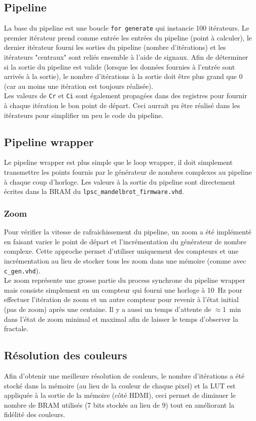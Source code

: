 \documentclass[LPSC_Labo03_SDeriaz]{subfiles}
\begin{document}
\subsection{Pipeline}
La base du pipeline est une boucle \verb!for generate! qui instancie 100 itérateurs. Le premier itérateur prend comme entrée les entrées du pipeline (point à calculer), le dernier itérateur fourni les sorties du pipeline (nombre d'itérations) et les itérateurs "centraux" sont reliés ensemble à l'aide de signaux. Afin de déterminer si la sortie du pipeline est valide (lorsque les données fournies à l'entrée sont arrivés à la sortie), le nombre d'itérations à la sortie doit être plus grand que 0 (car au moins une itération est toujours réalisée).\\
Les valeurs de \verb!Cr! et \verb!Ci! sont également propagées dans des registres pour fournir à chaque itération le bon point de départ. Ceci aurrait pu être réalisé dans les itérateurs pour simplifier un peu le code du pipeline.
\subsection{Pipeline wrapper}
Le pipeline wrapper est plus simple que le loop wrapper, il doit simplement transmettre les points fournis par le générateur de nombres complexes au pipeline à chaque coup d'horloge. Les valeurs à la sortie du pipeline sont directement écrites dans la BRAM du \verb!lpsc_mandelbrot_firmware.vhd!.\\
\subsubsection{Zoom}
Pour vérifier la vitesse de rafraichissement du pipeline, un zoom a été implémenté en faisant varier le point de départ et l'incrémentation du générateur de nombre complexe. Cette approche permet d'utiliser uniquement des compteurs et une incrémentation au lieu de stocker tous les zoom dans une mémoire (comme avec \verb!c_gen.vhd!).\\
Le zoom représente une grosse partie du process synchrone du pipeline wrapper mais consiste simplement en un compteur qui fourni une horloge à \SI{10}{\hertz} pour effectuer l'itération de zoom et un autre compteur pour revenir à l'état initial (pas de zoom) après une centaine. Il y a aussi un temps d'attente de $\approx$\SI{1}{\minute} dans l'état de zoom minimal et maximal afin de laisser le temps d'observer la fractale.
\subsection{Résolution des couleurs}
Afin d'obtenir une meilleure résolution de couleurs, le nombre d'itérations a été stocké dans la mémoire (au lieu de la couleur de chaque pixel) et la LUT est appliquée à la sortie de la mémoire (côté HDMI), ceci permet de diminuer le nombre de BRAM utilisés (7 bits stockés au lieu de 9) tout en améliorant la fidélité des couleurs.
\end{document}
